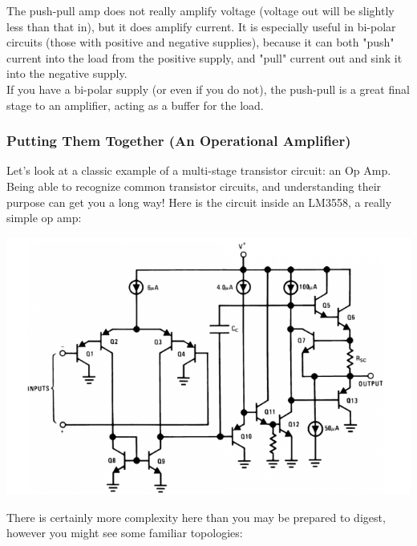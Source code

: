 \documentclass[a4paper, 11pt]{article} %
\begin{document}
The push-pull amp does not really amplify voltage (voltage out will be slightly less than that in), but it does amplify current. It is especially useful in bi-polar circuits (those with positive and negative supplies), because it can both "push" current into the load from the positive supply, and "pull" current out and sink it into the negative supply.\\

If you have a bi-polar supply (or even if you do not), the push-pull is a great final stage to an amplifier, acting as a buffer for the load.

\subsubsection*{Putting Them Together (An Operational Amplifier)}

Let's look at a classic example of a multi-stage transistor circuit: an Op Amp. Being able to recognize common transistor circuits, and understanding their purpose can get you a long way! Here is the circuit inside an LM3558, a really simple op amp:

\begin{center}
\includegraphics[width=380pt]{tran30}
\end{center}

There is certainly more complexity here than you may be prepared to digest, however you might see some familiar topologies:
\end{document}
